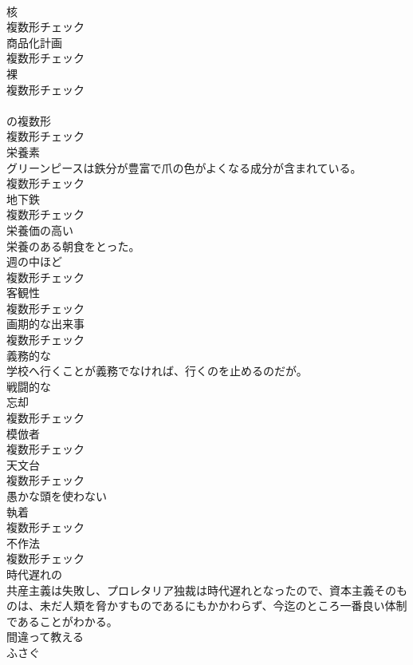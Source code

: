\documentclass[8pt]{extreport}
\begin{document}
\begin{CJK}{UTF8}{min}
\\	[名詞]	核	
\\	複数形チェック
\\	[名詞]	商品化計画	
\\	複数形チェック
\\	[名詞]	裸	
\\	複数形チェック
\\	[名詞]	
\\	の複数形	
\\	複数形チェック
\\	[名詞]	栄養素	
\\	グリーンピースは鉄分が豊富で爪の色がよくなる成分が含まれている。	
\\	複数形チェック
\\	[名詞]	地下鉄	
\\	複数形チェック
\\	[形容詞]	栄養価の高い	
\\	栄養のある朝食をとった。	
\\	[名詞]	週の中ほど	
\\	複数形チェック
\\	[名詞]	客観性	
\\	複数形チェック
\\	[名詞]	画期的な出来事	
\\	複数形チェック
\\	[形容詞]	義務的な	
\\	学校へ行くことが義務でなければ、行くのを止めるのだが。	
\\	[形容詞]	戦闘的な	
\\	[名詞]	忘却	
\\	複数形チェック
\\	[名詞]	模倣者	
\\	複数形チェック
\\	[名詞]	天文台	
\\	複数形チェック
\\	[形容詞]	愚かな頭を使わない	
\\	[名詞]	執着	
\\	複数形チェック
\\	[名詞]	不作法	
\\	複数形チェック
\\	[形容詞]	時代遅れの	
\\	共産主義は失敗し、プロレタリア独裁は時代遅れとなったので、資本主義そのものは、未だ人類を脅かすものであるにもかかわらず、今迄のところ一番良い体制であることがわかる。	
\\	[動詞]	間違って教える	
\\	[動詞]	ふさぐ	

\end{CJK}
\end{document}
